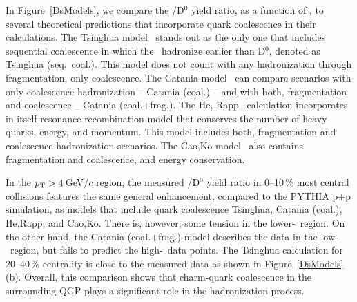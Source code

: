 In Figure~\ref{DsModels}, we compare the \Ds/D$^0$ yield ratio, as a function of \pt, to several theoretical predictions that incorporate quark coalescence in their calculations. The Tsinghua model~\cite{Tsinghua} stands out as the only one that includes sequential coalescence in which the \Ds\ hadronize earlier than D$^0$, denoted as Tsinghua (seq.\ coal.)\@. This model does not count with any hadronization through fragmentation, only coalescence. The Catania model~\cite{PlumariGreco} can compare scenarios with only coalescence hadronization -- Catania (coal.) -- and with both, fragmentation and coalescence -- Catania (coal.+frag.)\@. The He, Rapp~\cite{RappLc} calculation incorporates in itself resonance recombination model that conserves the number of heavy quarks, energy, and momentum.  This model includes both, fragmentation and coalescence hadronization scenarios. The Cao,Ko model~\cite{CaoKoDs} also contains fragmentation and coalescence, and energy conservation. 

In the ${p_{\mathrm{T}}} > 4\,$GeV$/c$ region, the measured \Ds/D$^0$ yield ratio in 0--10$\,\%$ most central collisions features the same general enhancement, compared to the PYTHIA p+p simulation, as models that include quark coalescence Tsinghua, Catania (coal.), He,Rapp, and Cao,Ko. There is, however, some tension in the lower-\pt\ region. On the other hand, the Catania (coal.+frag.) model describes the data in the low-\pt\ region, but fails to predict the high-\pt\ data points. The Tsinghua calculation for 20--40$\,\%$ centrality is close to the measured data as shown in Figure~\ref{DsModels}(b)\@. Overall, this comparison shows that charm-quark coalescence in the surrounding QGP plays a significant role in the hadronization process.
